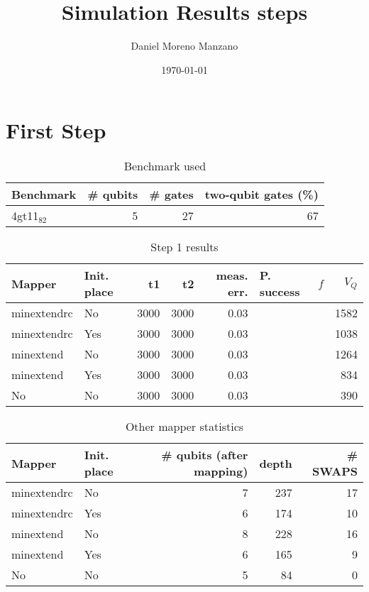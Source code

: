 \documentclass[11pt]{article}
\author{Daniel Moreno Manzano}
\date{\today}
\title{Simulation Results steps}
\begin{document}
\maketitle


\section{First Step}
\label{sec:org5ebfba0}

\begin{table}[htbp]
\caption{\label{tab:org28f3396}
Benchmark used}
\centering
\begin{tabular}{lrrr}
\hline
Benchmark & \# qubits & \# gates & two-qubit gates (\%)\\
\hline
4gt11\(_{\text{82}}\) & 5 & 27 & 67\\
\hline
\end{tabular}
\end{table}

\begin{table}[htbp]
\caption{\label{tab:orgf128bf4}
Step 1 results}
\centering
\begin{tabular}{llrrrllr}
\hline
Mapper & Init. place & t1 & t2 & meas. err. & P. success & \(f\) & \(V_Q\)\\
\hline
minextendrc & No & 3000 & 3000 & 0.03 &  &  & 1582\\
minextendrc & Yes & 3000 & 3000 & 0.03 &  &  & 1038\\
\hline
minextend & No & 3000 & 3000 & 0.03 &  &  & 1264\\
minextend & Yes & 3000 & 3000 & 0.03 &  &  & 834\\
No & No & 3000 & 3000 & 0.03 &  &  & 390\\
\hline
\end{tabular}
\end{table}

\begin{table}[htbp]
\caption{\label{tab:org7d26473}
Other mapper statistics}
\centering
\begin{tabular}{llrrr}
\hline
Mapper & Init. place & \# qubits (after mapping) & depth & \# SWAPS\\
\hline
minextendrc & No & 7 & 237 & 17\\
minextendrc & Yes & 6 & 174 & 10\\
\hline
minextend & No & 8 & 228 & 16\\
minextend & Yes & 6 & 165 & 9\\
No & No & 5 & 84 & 0\\
\hline
\end{tabular}
\end{table}
\end{document}
